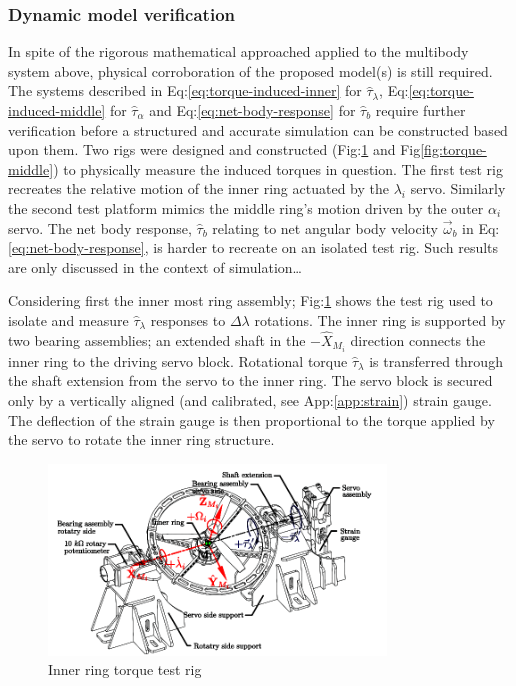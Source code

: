 \subsubsection{Dynamic model verification}
In spite of the rigorous mathematical approached applied to the multibody system above, physical corroboration of the proposed model(s) is still required. The systems described in Eq:\ref{eq:torque-induced-inner} for $\hat{\tau}_\lambda$, Eq:\ref{eq:torque-induced-middle} for $\hat{\tau}_\alpha$ and Eq:\ref{eq:net-body-response} for $\hat{\tau}_b$ require further verification before a structured and accurate simulation can be constructed based upon them. Two rigs were designed and constructed (Fig:\ref{fig:torque-inner} and Fig\ref{fig:torque-middle}) to physically measure the induced torques in question. The first test rig recreates the relative motion of the inner ring actuated by the $\lambda_i$ servo. Similarly the second test platform mimics the middle ring's motion driven by the outer $\alpha_i$ servo. The net body response, $\hat{\tau}_b$ relating to net angular body velocity $\vec{\omega}_b$ in Eq:\ref{eq:net-body-response}, is harder to recreate on an isolated test rig. Such results are only discussed in the context of simulation\ldots
\par
Considering first the inner most ring assembly; Fig:\ref{fig:torque-inner} shows the test rig used to isolate and measure $\hat{\tau}_\lambda$ responses to $\Delta\lambda$ rotations. The inner ring is supported by two bearing assemblies; an extended shaft in the $-\hat{X}_{M_i}$ direction connects the inner ring to the driving servo block. Rotational torque $\hat{\tau}_\lambda$ is transferred through the shaft extension from the servo to the inner ring. The servo block is secured only by a vertically aligned (and calibrated, see App:\ref{app:strain}) strain gauge. The deflection of the strain gauge is then proportional to the torque applied by the servo to rotate the inner ring structure.
\begin{figure}[htpb]
\centering
\includegraphics[width=0.8\textwidth]{figs/torque-inner}
\caption{Inner ring torque test rig}
\label{fig:torque-inner}
\vspace{-8pt}
\end{figure}
